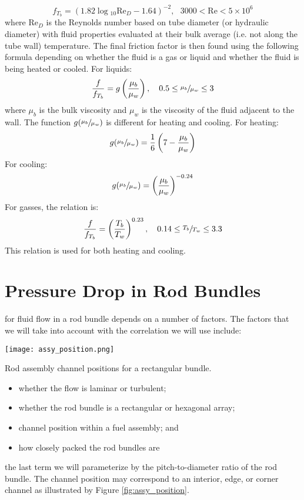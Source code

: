 $$ f_{T_{b}}= \left(1.82 \log{_{10}\text{Re}_{D}}-1.64  \right)^{-2}, \ \ \ 3000 < \text{Re} < 5\times 10^6$$
where $\text{Re}_{D}$ is the Reynolds number based on tube diameter (or hydraulic diameter) with fluid properties evaluated at their bulk average (i.e. not along the tube wall) temperature. The final friction factor is then found using the following formula depending on whether the fluid is a gas or liquid and whether the fluid is being heated or cooled.
For liquids:
$$\frac{f}{f_{T_b}}=g\left(\frac{\mu_b}{\mu_w} \right), \ \ \ 0.5 \le \sfrac{\mu_b}{\mu_w} \le 3$$
where $\mu_b$ is the bulk viscosity and $\mu_w$ is the viscosity of the fluid adjacent to the wall.  The function $g(\sfrac{\mu_b}{\mu_w})$ is different for heating and cooling. 
For heating:
$$g(\sfrac{\mu_b}{\mu_w})=\frac{1}{6}\left(7 - \frac{\mu_b}{\mu_w} \right)$$
For cooling:
$$g(\sfrac{\mu_b}{\mu_w})=\left(\frac{\mu_b}{\mu_w} \right)^{-0.24}$$
For gasses, the relation is:
$$\frac{f}{f_{T_b}}=\left(\frac{T_b}{T_w} \right)^{0.23}, \ \ \ 0.14 \le \sfrac{T_b}{T_w} \le 3.3 $$
This relation is used for both heating and cooling.


\section{Pressure Drop in Rod Bundles}

 for fluid flow in a rod bundle depends on a number of factors.  The factors that we will take into account with the correlation we will use include:

\begin{marginfigure}
\texttt{[image: assy\_position.png]}
\caption{Rod assembly channel positions for a rectangular bundle.}
\label{fig:assy_position}
\end{marginfigure}

\begin{itemize}
\item whether the flow is laminar or turbulent;
\item whether the rod bundle is a rectangular or hexagonal array;
\item channel position within a fuel assembly; and 
\item how closely packed the rod bundles are
\end{itemize}
the last term we will parameterize by the pitch-to-diameter ratio of the rod bundle.  The channel position may correspond to an interior, edge, or corner channel as illustrated by Figure \ref{fig:assy_position}.  

